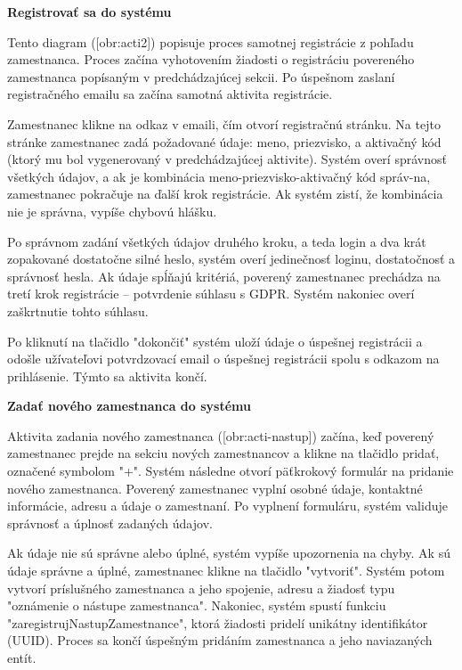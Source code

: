 \blank
\start
\setupindenting[no]
\start\bf Registrovať sa do systému\stop
\stop


Tento diagram ([obr:acti2]) popisuje proces samotnej registrácie z pohľadu zamestnanca. Proces začína vyhotovením žiadosti o registráciu povereného zamestnanca popísaným v predchádzajúcej sekcii. Po úspešnom zaslaní registračného emailu sa začína samotná aktivita registrácie.

Zamestnanec klikne na odkaz v emaili, čím otvorí registračnú stránku. Na tejto stránke zamestnanec zadá požadované údaje: meno, priezvisko, a aktivačný kód (ktorý mu bol vygenerovaný v predchádzajúcej aktivite). Systém overí správnosť všetkých údajov, a ak je kombinácia meno-priezvisko-aktivačný kód správ-na, zamestnanec pokračuje na ďalší krok registrácie. Ak systém zistí, že kombinácia nie je správna, vypíše chybovú hlášku.

Po správnom zadání všetkých údajov druhého kroku, a teda login a dva krát zopakované dostatočne silné heslo, systém overí jedinečnosť loginu, dostatočnosť a správnosť hesla. Ak údaje spĺňajú kritériá, poverený zamestnanec prechádza na tretí krok registrácie -- potvrdenie súhlasu s GDPR. Systém nakoniec overí zaškrtnutie tohto súhlasu.

Po kliknutí na tlačidlo "dokončiť" systém uloží údaje o úspešnej registrácii a odošle užívateľovi potvrdzovací email o úspešnej registrácii spolu s odkazom na prihlásenie. Týmto sa aktivita končí.

\blank
\start
\setupindenting[no]
\start\bf Zadať nového zamestnanca do systému\stop
\stop

Aktivita zadania nového zamestnanca ([obr:acti-nastup]) začína, keď poverený zamestnanec prejde na sekciu nových zamestnancov a klikne na tlačidlo pridať, označené symbolom "+". Systém následne otvorí päťkrokový formulár na pridanie nového zamestnanca. Poverený zamestnanec vyplní osobné údaje, kontaktné informácie, adresu a údaje o zamestnaní. Po vyplnení formuláru, systém validuje správnosť a úplnosť zadaných údajov.

Ak údaje nie sú správne alebo úplné, systém vypíše upozornenia na chyby. Ak sú údaje správne a úplné, zamestnanec klikne na tlačidlo "vytvoriť". Systém potom vytvorí príslušného zamestnanca a jeho spojenie, adresu a žiadosť typu "oznámenie o nástupe zamestnanca". Nakoniec, systém spustí funkciu "zaregistrujNastupZamestnance", ktorá žiadosti pridelí unikátny identifikátor (UUID). Proces sa končí úspešným pridáním zamestnanca a jeho naviazaných entít.

